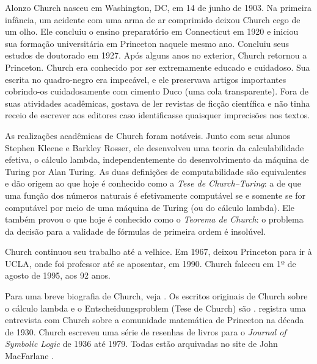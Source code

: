 \documentclass[../../../include/open-logic-section]{subfiles}
\begin{document}



Alonzo Church nasceu em Washington, DC, em 14 de junho de 1903. Na primeira
infância, um acidente com uma arma de ar comprimido deixou Church cego de um
olho. Ele concluiu o ensino preparatório em Connecticut em 1920 e iniciou sua
formação universitária em Princeton naquele mesmo ano. Concluiu seus estudos
de doutorado em 1927. Após alguns anos no exterior, Church retornou a
Princeton. Church era conhecido por ser extremamente educado e cuidadoso. Sua
escrita no quadro-negro era impecável, e ele preservava artigos importantes
cobrindo-os cuidadosamente com cimento Duco (uma cola transparente). Fora de
suas atividades acadêmicas, gostava de ler revistas de ficção científica e não
tinha receio de escrever aos editores caso identificasse quaisquer imprecisões
nos textos.

As realizações acadêmicas de Church foram notáveis. Junto com seus alunos
Stephen Kleene e Barkley Rosser, ele desenvolveu uma teoria da calculabilidade
efetiva, o cálculo lambda, independentemente do desenvolvimento da máquina de
Turing por Alan Turing. As duas definições de computabilidade são equivalentes
e dão origem ao que hoje é conhecido como a \emph{Tese de Church--Turing}: a de
que uma função dos números naturais é efetivamente computável se e somente se
for computável por meio de uma máquina de Turing (ou do cálculo lambda). Ele
também provou o que hoje é conhecido como o \emph{Teorema de Church}: o
problema da decisão para a validade de fórmulas de primeira ordem é insolúvel.

Church continuou seu trabalho até a velhice. Em 1967, deixou Princeton para ir
à UCLA, onde foi professor até se aposentar, em 1990. Church faleceu em 1º de
agosto de 1995, aos 92 anos.

\begin{reading} 
Para uma breve biografia de Church, veja \citet{EndertonND}. Os escritos
originais de Church sobre o cálculo lambda e o Entscheidungsproblem (Tese de
Church) são \citet{Church1936,Church1936a}.
\citet{Aspray1984} registra uma entrevista com Church sobre a comunidade
matemática de Princeton na década de 1930.
Church escreveu uma série de resenhas de livros para o \emph{Journal of
Symbolic Logic} de 1936 até 1979. Todas estão arquivadas no site de John
MacFarlane \citep{MacFarlane2015}.
\end{reading} 
\end{document}

